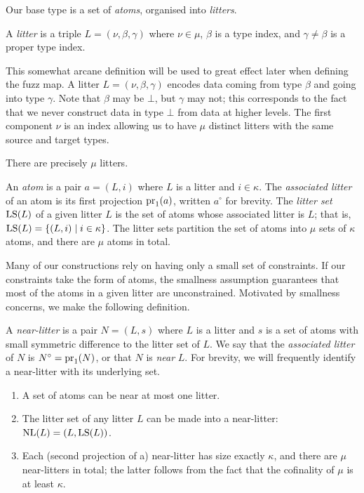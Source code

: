 Our base type is a set of \emph{atoms}, organised into \emph{litters}.
\begin{definition}
    A \emph{litter} is a triple \( L = (\nu, \beta, \gamma) \) where \( \nu \in \mu \), \( \beta \) is a type index, and \( \gamma \neq \beta \) is a proper type index.
\end{definition}
This somewhat arcane definition will be used to great effect later when defining the fuzz map.
A litter \( L = (\nu, \beta, \gamma) \) encodes data coming from type \( \beta \) and going into type \( \gamma \).
Note that \( \beta \) may be \( \bot \), but \( \gamma \) may not; this corresponds to the fact that we never construct data in type \( \bot \) from data at higher levels.
The first component \( \nu \) is an index allowing us to have \( \mu \) distinct litters with the same source and target types.
\begin{remark}
    There are precisely \( \mu \) litters.
\end{remark}
\begin{definition}
    An \emph{atom} is a pair \( a = (L, i) \) where \( L \) is a litter and \( i \in \kappa \).
    The \emph{associated litter} of an atom is its first projection \( \operatorname{pr}_1(a) \), written \( a^\circ \) for brevity.
    The \emph{litter set} \( \operatorname{LS}(L) \) of a given litter \( L \) is the set of atoms whose associated litter is \( L \); that is, \( \operatorname{LS}(L) = \{ (L, i) \mid i \in \kappa \} \).
    The litter sets partition the set of atoms into \( \mu \) sets of \( \kappa \) atoms, and there are \( \mu \) atoms in total.
\end{definition}
\begin{remark}
    Many of our constructions rely on having only a small set of constraints.
    If our constraints take the form of atoms, the smallness assumption guarantees that most of the atoms in a given litter are unconstrained.
    Motivated by smallness concerns, we make the following definition.
\end{remark}
\begin{definition}
    A \emph{near-litter} is a pair \( N = (L, s) \) where \( L \) is a litter and \( s \) is a set of atoms with small symmetric difference to the litter set of \( L \).
    We say that the \emph{associated litter} of \( N \) is \( N^\circ = \operatorname{pr}_1(N) \), or that \( N \) is \emph{near} \( L \).
    For brevity, we will frequently identify a near-litter with its underlying set.
\end{definition}
\begin{remarks}\mbox{\negthinspace}
    \label{rk:mk_near_litter}
    \begin{enumerate}
        \item A set of atoms can be near at most one litter.
        \item The litter set of any litter \( L \) can be made into a near-litter: \( \operatorname{NL}(L) = (L, \operatorname{LS}(L)) \).
        \item Each (second projection of a) near-litter has size exactly \( \kappa \), and there are \( \mu \) near-litters in total; the latter follows from the fact that the cofinality of \( \mu \) is at least \( \kappa \).
    \end{enumerate}
\end{remarks}
